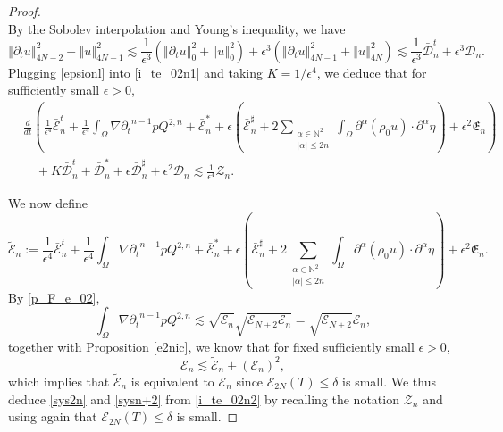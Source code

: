 \documentclass[a4paper,reqno,11pt]{amsart}
\numberwithin{equation}{section}
\providecommand{\norm}[1]{\left\Vert#1\right\Vert}
\providecommand{\norm}[1]{\left\Vert#1\right\Vert}
\begin{document}
\begin{proof}
\begin{equation}
\end{equation}
By the Sobolev interpolation and Young's inequality, we have
\begin{equation} \label{epsionl}
\norm{{\partial_t} u}_{4N-2}^2 +\norm{  u}_{4N-1}^2 {\lesssim} \frac{1}{\epsilon^3}(\norm{{\partial_t} u}_{0}^2 +\norm{  u}_{0}^2)+{\epsilon^3}(\norm{{\partial_t} u}_{4N-1}^2 +\norm{  u}_{4N}^2)
 {\lesssim} \frac{1}{\epsilon^3}\bar{\mathcal{D}}_{n}^t +{\epsilon^3}{\mathcal{D}}_{n}.
\end{equation}
Plugging \eqref{epsionl} into \eqref{i_te_02n1} and taking $K=1/\epsilon^4$, we deduce that for sufficiently small $\epsilon>0$,
\begin{equation} \label{i_te_02n2}
\begin{split}
 & \frac{d}{dt}\left(\frac{1}{\epsilon^4}\bar{\mathcal{E}}_{n}^t +\frac{1}{\epsilon^4}\int_\Omega  \nabla {\partial_t}^{n-1} p  Q^{2,n}+ \bar{\mathcal{E}}_{n}^*+\epsilon\left( \bar{\mathcal{E}}_{n}^\sharp+2\sum_{\substack{{\alpha}\in \mathbb{N}^2\\  |{\alpha}|\le 2n}}\int_\Omega \partial^\alpha ( \rho_0   u )\cdot \partial^\alpha  \eta\right)+\epsilon^2 \mathfrak{E}_{n}\right)
 \\&\quad + K\bar{\mathcal{D}}_{n}^t+\bar{\mathcal{D}}_{n}^*+\epsilon \bar{\mathcal{D}}_{n}^\sharp+\epsilon^2  {\mathcal{D}}_{n} {\lesssim} \frac{1}{\epsilon^4}\mathcal{Z}_n.
   \end{split}
\end{equation}

We now define
\begin{equation}
\tilde{ \mathcal{E}}_{n}:=\frac{1}{\epsilon^4}\bar{\mathcal{E}}_{n}^t +\frac{1}{\epsilon^4}\int_\Omega  \nabla {\partial_t}^{n-1} p  Q^{2,n}+ \bar{\mathcal{E}}_{n}^*+\epsilon\left( \bar{\mathcal{E}}_{n}^\sharp+2\sum_{\substack{{\alpha}\in \mathbb{N}^2\\  |{\alpha}|\le 2n}}\int_\Omega \partial^\alpha ( \rho_0   u )\cdot \partial^\alpha  \eta\right)+\epsilon^2 \mathfrak{E}_{n} .
\end{equation}
By \eqref{p_F_e_02},
\begin{equation}
\int_\Omega  \nabla {\partial_t}^{n-1} p  Q^{2,n}{\lesssim} \sqrt{\mathcal{E}_n}\sqrt{\mathcal{E}_{N+2}\mathcal{E}_n}=\sqrt{\mathcal{E}_{N+2}}\mathcal{E}_n,
\end{equation}
together with Proposition \ref{e2nic}, we know that for fixed sufficiently small $\epsilon>0$,
\begin{equation}
\mathcal{E}_{n}{\lesssim} \tilde{ \mathcal{E}}_{n}+(\mathcal{E}_{n} )^{2},
\end{equation}
which implies that $\tilde{ \mathcal{E}}_{n}$ is equivalent to $ \mathcal{E}_{n}$ since ${\mathcal{E}}_{2N} (T)\le  \delta$ is small. We thus deduce \eqref{sys2n} and \eqref{sysn+2} from \eqref{i_te_02n2} by recalling the notation $\mathcal{Z}_n$ and using again that ${\mathcal{E}}_{2N} (T)\le \delta$ is small.
\end{proof}
\end{document}
